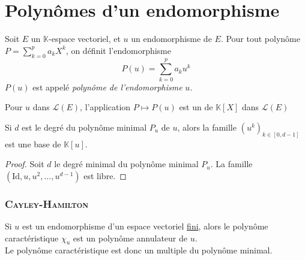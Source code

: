 \documentclass[11pt,a4paper,fleqn,pdftex]{report}
\begin{document}
\section{Polynômes d'un endomorphisme} %
\label{sec:polyn_mes_d_un_endomorphisme}
\begin{dfn}
     Soit $E$ un $\mathbb{K}$-espace vectoriel, et $u$ un endomorphisme de $E$. \newline
     Pour tout polynôme $P = \sum_{k=0}^p a_k X^k$, on définit l'endomorphisme 
     \begin{equation}
     P(u) = \sum_{k=0}^p a_k u^k
     \end{equation}
     $P(u)$ est appelé \emph{polynôme de l'endomorphisme} $u$.
\end{dfn}
\needspace{3cm}
\begin{theorem}
     Pour $u$ dans $\mathscr{L}(E)$, l'application $P \mapsto P(u)$ est un  de $\mathbb{K} [X]$ dans $\mathscr{L}(E)$
\end{theorem}
\begin{theorem}%
     Si $d$ est le degré du polynôme minimal $P_u$ de $u$, alors la famille $(u^k)_{k \in \left[ 0 , d-1 \right] }$ est une base de $\mathbb{K} [u]$.
\end{theorem}
\begin{proof}
     Soit $d$ le degré minimal du polynôme minimal $P_u$. La famille $(\mathrm{Id}, u, u^2, \ldots , u^{d-1} )$ est libre. 
\end{proof}
\subsubsection{\textsc{Cayley}-\textsc{Hamilton}} %
\label{ssub:Cayley-Hamilton}
\begin{itheorem}
Si $u$ est un endomorphisme d'un espace vectoriel \uline{fini}, alors le polynôme caractéristique $\chi_u$ est un polynôme annulateur de $u$. \\
Le polynôme caractéristique est donc un multiple du polynôme minimal. 
\end{itheorem}
\end{document}
